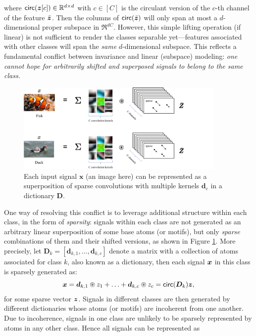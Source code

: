 \documentclass[../../book-main.tex]{subfiles}
\begin{document}
where $\mathsf{circ}(\bm{z}[c]) \in \mathbb{R}^{d\times d}$ with $c \in [C]$ is the circulant version of the $c$-th channel of the feature $\bar {\bm{z}}$. Then the columns of $\mathsf{circ}(\bar{\bm{z}})$  will only span at most a $d$-dimensional proper subspace in $\Re^{dC}$.  However, this simple lifting operation (if linear) is not sufficient to render the classes separable yet---features associated with other classes will span the {\em same} $d$-dimensional subspace. This reflects a fundamental conflict between invariance and linear (subspace) modeling: {\em one cannot hope for arbitrarily shifted and superposed signals to belong to the same class.} 

\begin{figure}[t]
	\centerline{
\includegraphics[width=0.9\textwidth]{figs_chap4/sparse-representation.pdf}}
	\caption{Each input signal $\bm x$ (an image here) can be represented as a superposition of sparse convolutions with multiple kernels $\bm d_c$ in a dictionary $\bm D$.}
	\label{fig:multi-channel-sparse-representation}
\end{figure}
One way of resolving this conflict is to leverage additional structure within each class, in the form of {\em sparsity}: signals within each class are not generated as an arbitrary linear superposition of some base atoms (or motifs), but only {\em sparse} combinations of them and their shifted versions, as shown in Figure \ref{fig:multi-channel-sparse-representation}. More precisely, let $\bm D_k = [\bm d_{k,1}, \ldots, \bm d_{k,c}]$ denote a matrix with a collection of atoms associated for class $k$, also known as a dictionary, then each signal $\bm{x}$ in this class is sparsely generated as: 
\begin{equation}
    \bm{x} = \bm d_{k,1} \circledast z_1 + \ldots + \bm d_{k,c} \circledast z_c = \mathsf{circ}(\bm{D}_k)\bm{z},
\end{equation}
for some sparse vector $\bm{z}$. Signals in different classes are then generated by different dictionaries whose atoms (or motifs) are incoherent from one another. Due to incoherence, signals in one class are unlikely to be sparsely represented by atoms in any other class. Hence all signals can be represented as
\end{document}
